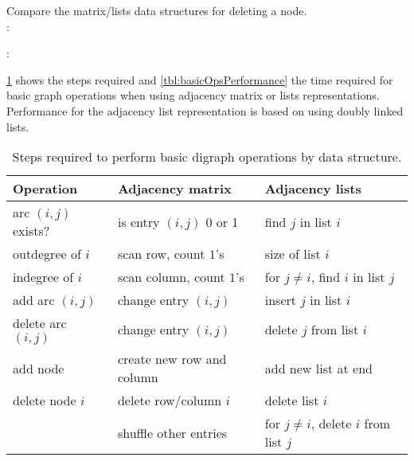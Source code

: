 \begin{Boxample}[3]
Compare the matrix/lists data structures for deleting a node.\\
	: \vspace{3cm}
	
	: 
\end{Boxample}

\cref{tbl:basicOpsSteps} shows the steps required  
and \cref{tbl:basicOpsPerformance} the time required for basic graph operations 
when using adjacency matrix or lists representations.  
Performance for the adjacency list representation is based on using doubly linked lists.

\begin{table}[H]
\centering
\caption{Steps required to perform basic digraph operations by data structure.}
\label{tbl:basicOpsSteps}
\begin{tabular}{|l|l|l|}
\hline
\textbf{Operation} & \textbf{Adjacency matrix} & \textbf{Adjacency lists} \\
\hline
arc $(i, j)$ exists? & is entry $(i,j)$ 0 or 1  & find $j$ in  list $i$ \\
\hline
outdegree  of $i$ & scan row, count $1$'s & size of  list  $i$\\
\hline
indegree of $i$ & scan column,  count $1$'s & for $j\neq i$, find $i$ in list $j$ \\
\hline
add arc $(i, j)$ & change entry $(i ,j)$ & insert $j$ in list $i$ \\
\hline
delete arc $(i, j)$ & change entry $(i ,j)$ & delete $j$ from list $i$ \\
\hline
add node & create new row and column & add new list at end\\
\hline
delete node $i$ & delete row/column $i$  & delete list $i$ \\
& shuffle other entries & for $j\neq i$, delete  $i$ from list $j$ \\
\hline
\end{tabular}
\end{table}

